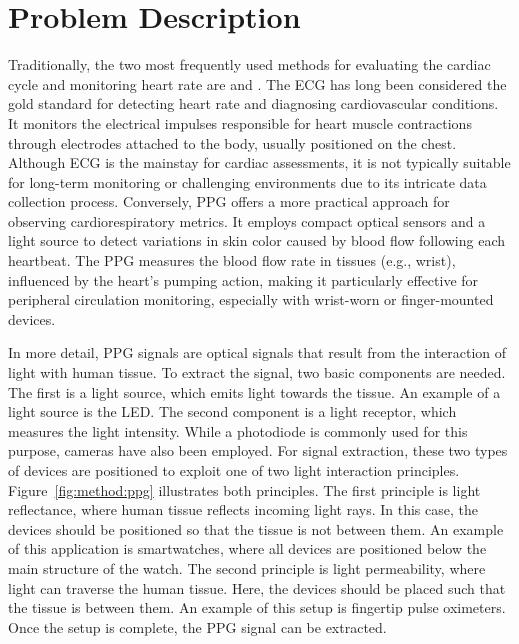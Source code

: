 \section{Problem Description}
\label{sec:problem}

Traditionally, the two most frequently used methods for evaluating the cardiac cycle and monitoring heart rate are  and . The \gls{ECG} has long been considered the gold standard for detecting heart rate and diagnosing cardiovascular conditions. It monitors the electrical impulses responsible for heart muscle contractions through electrodes attached to the body, usually positioned on the chest. Although \gls{ECG} is the mainstay for cardiac assessments, it is not typically suitable for long-term monitoring or challenging environments due to its intricate data collection process. Conversely, \gls{PPG} offers a more practical approach for observing cardiorespiratory metrics. It employs compact optical sensors and a light source to detect variations in skin color caused by blood flow following each heartbeat. The \gls{PPG} measures the blood flow rate in tissues (e.g., wrist), influenced by the heart's pumping action, making it particularly effective for peripheral circulation monitoring, especially with wrist-worn or finger-mounted devices.



In more detail, \gls{PPG} signals are optical signals that result from the interaction of light with human tissue. To extract the signal, two basic components are needed. The first is a light source, which emits light towards the tissue. An example of a light source is the \gls{LED}. The second component is a light receptor, which measures the light intensity. While a photodiode is commonly used for this purpose, cameras have also been employed. For signal extraction, these two types of devices are positioned to exploit one of two light interaction principles. Figure~\ref{fig:method:ppg} illustrates both principles. The first principle is light reflectance, where human tissue reflects incoming light rays. In this case, the devices should be positioned so that the tissue is not between them. An example of this application is smartwatches, where all devices are positioned below the main structure of the watch. The second principle is light permeability, where light can traverse the human tissue. Here, the devices should be placed such that the tissue is between them. An example of this setup is fingertip pulse oximeters. Once the setup is complete, the \gls{PPG} signal can be extracted.

